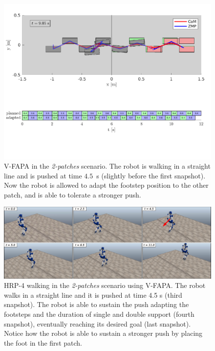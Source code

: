\begin{figure}
    \includegraphics[trim={0 2.2cm 0 8.6cm},clip,width=\textwidth]{figures/two-patches-mixed-integer-completing-task.pdf}
    \caption{V-FAPA in the {\em 2-patches} scenario. The robot is walking in a straight line and is pushed at time $4.5$~s (slightly before the first snapshot). Now the robot is allowed to adapt the footstep position to the other patch, and is able to tolerate a stronger push.}
    \label{fig:FAPA:matlab_2pacmi}
\end{figure}

\begin{figure}
    \centering
    \includegraphics[width=\textwidth]{figures/two-patches-push-mixed-integer-snapshots.jpeg}
    \caption{HRP-4 walking in the \textit{2-patches} scenario using V-FAPA. The robot walks in a straight line and it is pushed at time 4.5 s (third snapshot). The robot is able to sustain the push adapting the footsteps and the duration of single and double support (fourth snapshot), eventually reaching its desired goal (last snapshot). Notice how the robot is able to sustain a stronger push by placing the foot in the first patch.}
    \label{fig:FAPA:sim3:snapshots}
\end{figure}

